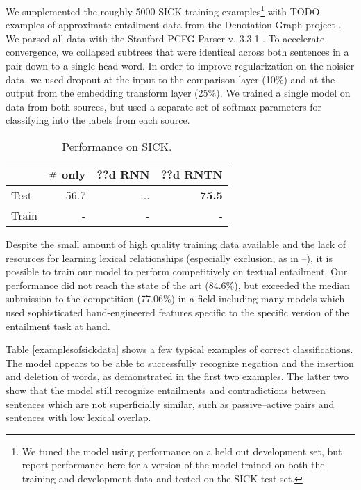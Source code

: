 We supplemented the roughly 5000 SICK training examples\footnote{We tuned the model using performance on a held out development set, but report performance here for a version of the model trained on both the training and development data and tested on the SICK test set.} with TODO examples of approximate entailment data from the Denotation Graph project \cite{hodoshimage}. We parsed all data with the Stanford PCFG Parser v. 3.3.1 \cite{klein2003accurate}. To accelerate convergence, we collapsed subtrees that were identical across both sentences in a pair down to a single head word. In order to improve regularization on the noisier data, we used dropout \cite{hinton2012improving} at the input to the comparison layer (10\%) and at the output from the embedding transform layer (25\%). We trained a single model on data from both sources, but used a separate set of softmax parameters for classifying into the labels from each source.

\begin{table}[tp]
  \centering \small
  \begin{tabular}{ l r@{ \ } r@{ \ } r@{ \ } }
    \toprule
    ~&\multicolumn{1}{c}{$\mathbin{\#}$ only} & \multicolumn{1}{c}{??d RNN}  & \multicolumn{1}{c}{??d RNTN}\\
    \midrule
    Test & 56.7 &	...& \textbf{75.5} \\
    Train &- &- &-  \\
    \bottomrule
  \end{tabular}
  \caption{Performance on SICK.}
  \label{sresultstable}
\end{table} 

Despite the small amount of high quality training data available and the lack of resources for learning lexical relationships (especially exclusion, as in --), it is possible to train our model to perform competitively on textual entailment. Our performance did not reach the state of the art (84.6\%), but exceeded the median submission to the competition (77.06\%) in a field including many models which used sophisticated hand-engineered features specific to the specific version of the entailment task at hand.

Table \ref{examplesofsickdata} shows a few typical examples of correct classifications. The model appears to be able to successfully recognize negation and the insertion and deletion of words, as demonstrated in the first two examples. The latter two show that the model still recognize entailments and contradictions between sentences which are not superficially similar, such as passive--active pairs and sentences with low lexical overlap.